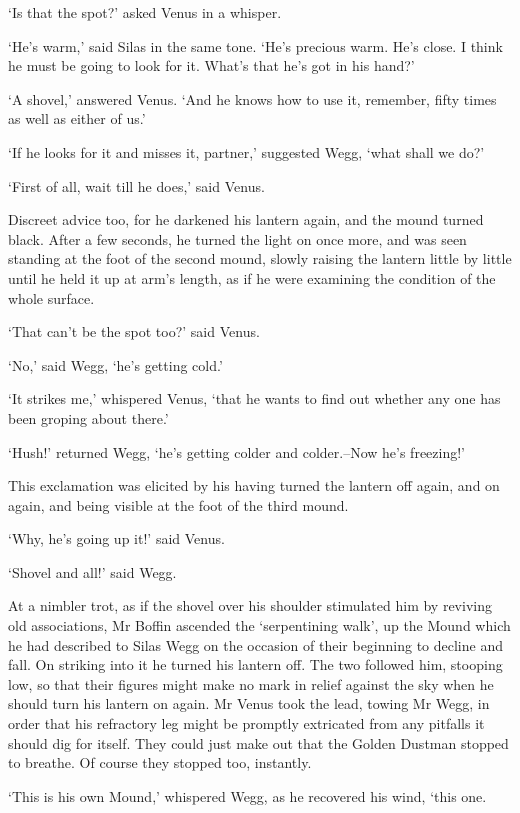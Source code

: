 ‘Is that the spot?’ asked Venus in a whisper.

‘He’s warm,’ said Silas in the same tone. ‘He’s precious warm. He’s
close. I think he must be going to look for it. What’s that he’s got in
his hand?’

‘A shovel,’ answered Venus. ‘And he knows how to use it, remember, fifty
times as well as either of us.’

‘If he looks for it and misses it, partner,’ suggested Wegg, ‘what shall
we do?’

‘First of all, wait till he does,’ said Venus.

Discreet advice too, for he darkened his lantern again, and the mound
turned black. After a few seconds, he turned the light on once more, and
was seen standing at the foot of the second mound, slowly raising the
lantern little by little until he held it up at arm’s length, as if he
were examining the condition of the whole surface.

‘That can’t be the spot too?’ said Venus.

‘No,’ said Wegg, ‘he’s getting cold.’

‘It strikes me,’ whispered Venus, ‘that he wants to find out whether any
one has been groping about there.’

‘Hush!’ returned Wegg, ‘he’s getting colder and colder.--Now he’s
freezing!’

This exclamation was elicited by his having turned the lantern off
again, and on again, and being visible at the foot of the third mound.

‘Why, he’s going up it!’ said Venus.

‘Shovel and all!’ said Wegg.

At a nimbler trot, as if the shovel over his shoulder stimulated him by
reviving old associations, Mr Boffin ascended the ‘serpentining walk’,
up the Mound which he had described to Silas Wegg on the occasion of
their beginning to decline and fall. On striking into it he turned his
lantern off. The two followed him, stooping low, so that their figures
might make no mark in relief against the sky when he should turn his
lantern on again. Mr Venus took the lead, towing Mr Wegg, in order that
his refractory leg might be promptly extricated from any pitfalls it
should dig for itself. They could just make out that the Golden Dustman
stopped to breathe. Of course they stopped too, instantly.

‘This is his own Mound,’ whispered Wegg, as he recovered his wind, ‘this
one.

